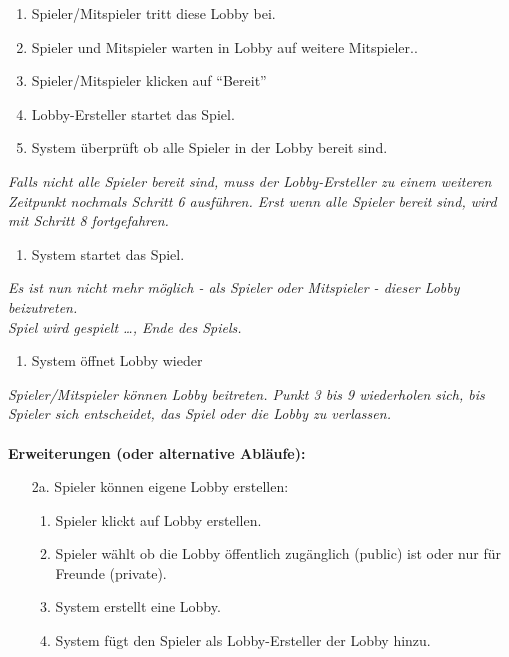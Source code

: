 \documentclass[11pt,ngerman]{article}
\newcommand{\quotes}[1]{``#1''}
\begin{document}
\begin{tcolorbox}
\begin{enumerate}
                    \item Spieler/Mitspieler tritt diese \Gls{Lobby} bei.
                    \item Spieler und Mitspieler warten in \Gls{Lobby} auf weitere Mitspieler..
                    \item Spieler/Mitspieler klicken auf \quotes{Bereit}
                    \item Lobby-Ersteller startet das Spiel.
                    \item System überprüft ob alle Spieler in der \Gls{Lobby} bereit sind.
                \end{enumerate}
                \textit{Falls nicht alle Spieler bereit sind, muss der Lobby-Ersteller zu einem weiteren Zeitpunkt nochmals Schritt 6 ausführen. Erst wenn alle Spieler bereit sind, wird mit Schritt 8 fortgefahren.}
                \begin{enumerate}[resume]
                    \item System startet das Spiel.
                \end{enumerate}
                \textit{Es ist nun nicht mehr möglich - als Spieler oder Mitspieler - dieser \Gls{Lobby} beizutreten.} \\
                \textit{Spiel wird gespielt …, Ende des Spiels.}
                \begin{enumerate}[resume]
                    \item System öffnet \Gls{Lobby} wieder
                \end{enumerate}
                \textit{Spieler/Mitspieler können \Gls{Lobby} beitreten. Punkt 3 bis 9 wiederholen sich, bis Spieler sich entscheidet, das Spiel oder die \Gls{Lobby} zu verlassen.} \\
                \\ \textbf{Erweiterungen (oder alternative Abläufe):}
                \begin{itemize}
                    \item[2a.] Spieler können eigene \Gls{Lobby} erstellen:
                    \begin{enumerate}
                        \item Spieler klickt auf \Gls{Lobby} erstellen.
                        \item Spieler wählt ob die \Gls{Lobby} öffentlich zugänglich (public) ist oder nur für Freunde (private).
                        \item System erstellt eine \Gls{Lobby}.
                        \item System fügt den Spieler als Lobby-Ersteller der \Gls{Lobby} hinzu.

\end{enumerate}
\end{itemize}
\end{tcolorbox}
\end{document}
